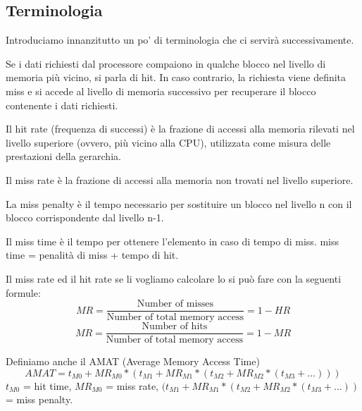 \subsection{Terminologia}
Introduciamo innanzitutto un po' di terminologia che ci servirà successivamente.

\begin{definition}
Se i dati richiesti dal processore compaiono in qualche blocco nel livello di memoria più vicino, si parla di hit. In caso contrario, la richiesta viene definita miss e si accede al livello di memoria successivo per recuperare il blocco contenente i dati richiesti.
\end{definition}

\begin{definition}
    Il hit rate (frequenza di successi) è la frazione di accessi alla memoria rilevati nel livello superiore (ovvero, più vicino alla CPU), utilizzata come misura delle prestazioni della gerarchia.
\end{definition}

\begin{definition}
    Il miss rate è la frazione di accessi alla memoria non trovati nel livello superiore.
\end{definition}

\begin{definition}
    La miss penalty è il tempo necessario per sostituire un blocco nel livello n con il blocco corrispondente dal livello n-1.
\end{definition}

\begin{definition}
    Il miss time è il tempo per ottenere l'elemento in caso di tempo di miss. miss time = penalità di miss + tempo di hit.
\end{definition}

Il miss rate ed il hit rate se li vogliamo calcolare lo si può fare con la seguenti formule:
\begin{equation}
    MR = \frac{\text{Number of misses}}{\text{Number of total memory access}} = 1 - HR
\end{equation}
\begin{equation}
    MR = \frac{\text{Number of hits}}{\text{Number of total memory access}} = 1 - MR
\end{equation}

Definiamo anche il AMAT (Average Memory Access Time)
\begin{equation}
    AMAT = t_{M0} + MR_{M0} * (t_{M1} + MR_{M1} * (t_{M2} + MR_{M2} * (t_{M3} + \dots)))
\end{equation}
$t_{M0}$ = hit time, $MR_{M0}$ = miss rate, $(t_{M1} + MR_{M1} * (t_{M2} + MR_{M2} * (t_{M3} + \dots))$ = miss penalty.

